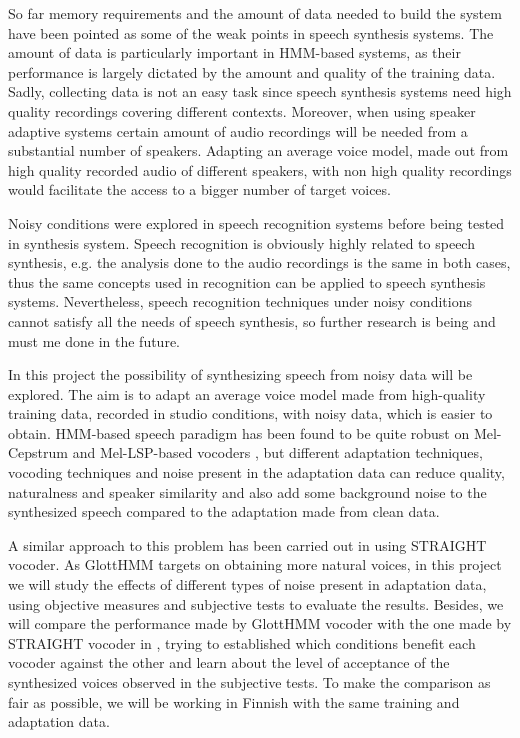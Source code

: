 So far memory requirements and the amount of data needed to build the system have been pointed as some of the weak points in speech synthesis systems. The amount of data is particularly important in HMM-based systems, as their performance is largely dictated by the amount and quality of the training data. Sadly, collecting data is not an easy task since speech synthesis systems need high quality recordings covering different contexts. Moreover, when using speaker adaptive systems certain amount of audio recordings will be needed from a substantial number of speakers. Adapting an average voice model, made out from high quality recorded audio of different speakers, with non high quality recordings would facilitate the access to a bigger number of target voices.

Noisy conditions were explored in speech recognition systems before being tested in synthesis system. Speech recognition is obviously highly related to speech synthesis, e.g. the analysis done to the audio recordings is the same in both cases, thus the same concepts used in recognition can be applied to speech synthesis systems. Nevertheless, speech recognition techniques under noisy conditions cannot satisfy all the needs of speech synthesis, so further research is being and must me done in the future.

In this project the possibility of synthesizing speech from noisy data will be explored. The aim is to adapt an average voice model made from high-quality training data, recorded in studio conditions, with noisy data, which is easier to obtain. HMM-based speech paradigm has been found to be quite robust on Mel-Cepstrum \cite{karhila_jstsp_14, yamagishi2008robustness} and Mel-LSP-based vocoders \cite{Yanagisawa_SSW8}, but different adaptation techniques, vocoding techniques and noise present in the adaptation data can reduce quality, naturalness and speaker similarity and also add some background noise to the synthesized speech compared to the adaptation made from clean data. 

A similar approach to this problem has been carried out in \cite{karhila_jstsp_14} using STRAIGHT vocoder. As GlottHMM targets on obtaining more natural voices, in this project we will study the effects of different types of noise present in adaptation data, using objective measures and subjective tests to evaluate the results. Besides, we will compare the performance made by GlottHMM vocoder with the one made by STRAIGHT vocoder in \cite{karhila_jstsp_14}, trying to established which conditions benefit each vocoder against the other and learn about the level of acceptance of the synthesized voices observed in the subjective tests. To make the comparison as fair as possible, we will be working in Finnish with the same training and adaptation data.
